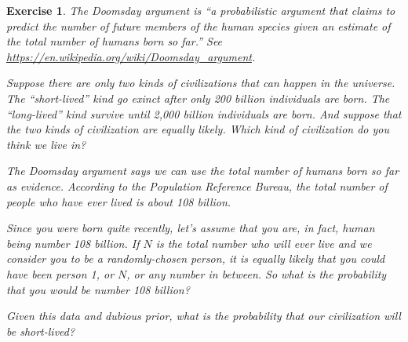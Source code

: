 \documentclass[12pt]{book}
\theoremstyle{exercise}
\newtheorem{exercise}{Exercise}[chapter]
\begin{document}
\begin{exercise}
The Doomsday argument is ``a probabilistic argument that claims to predict the number of future members of the human species given an estimate of the total number of humans born so far.''  See \url{https://en.wikipedia.org/wiki/Doomsday_argument}.

Suppose there are only two kinds of civilizations that can happen in the universe. The ``short-lived'' kind go exinct after only 200 billion individuals are born. The ``long-lived'' kind survive until 2,000 billion individuals are born. And suppose that the two kinds of civilization are equally likely.  Which kind of civilization do you think we live in?

The Doomsday argument says we can use the total number of humans born so far as evidence.
According to the Population Reference Bureau, the total number of people who have ever lived is about 108 billion.

Since you were born quite recently, let's assume that you are, in fact, human being number 108 billion.
If $N$ is the total number who will ever live and we consider you to be a randomly-chosen person, it is equally likely that you could have been person 1, or $N$, or any number in between.
So what is the probability that you would be number 108 billion?

Given this data and dubious prior, what is the probability that our civilization will be short-lived?

\end{exercise}
\end{document}
